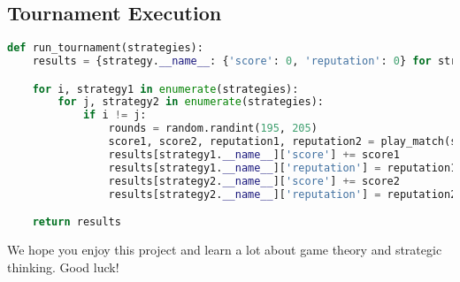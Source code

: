 \documentclass[11pt]{article}
\begin{document}
\newpage

\subsection*{Tournament Execution}
\begin{lstlisting}[language=Python]
def run_tournament(strategies):
    results = {strategy.__name__: {'score': 0, 'reputation': 0} for strategy in strategies}

    for i, strategy1 in enumerate(strategies):
        for j, strategy2 in enumerate(strategies):
            if i != j:
                rounds = random.randint(195, 205)
                score1, score2, reputation1, reputation2 = play_match(strategy1, strategy2, rounds)
                results[strategy1.__name__]['score'] += score1
                results[strategy1.__name__]['reputation'] = reputation1
                results[strategy2.__name__]['score'] += score2
                results[strategy2.__name__]['reputation'] = reputation2

    return results
\end{lstlisting}

We hope you enjoy this project and learn a lot about game theory and strategic thinking. Good luck!
\end{document}
